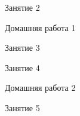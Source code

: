 \begin{class}[number=2]
	\begin{listofex}
		\item Занятие 2
	\end{listofex}
\end{class}

\begin{homework}[number=1]
	\begin{listofex}
		\item Домашняя работа 1
	\end{listofex}
\end{homework}

\begin{class}[number=3]
	\begin{listofex}
		\item Занятие 3 
	\end{listofex}
\end{class}

\begin{class}[number=4]
	\begin{listofex}
		\item Занятие 4
	\end{listofex}
\end{class}

\begin{homework}[number=2]
	\begin{listofex}
		\item Домашняя работа 2
	\end{listofex}
\end{homework}

\begin{class}[number=5]
	\begin{listofex}
		\item Занятие 5
	\end{listofex}
\end{class}

